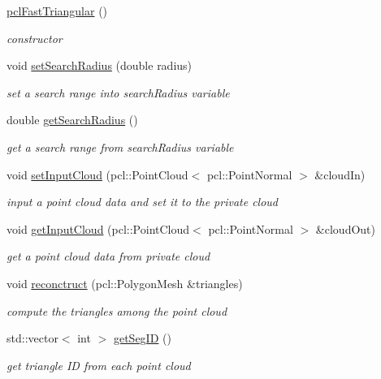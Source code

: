 \begin{DoxyCompactItemize}
\item 
\hyperlink{classpclFastTriangular_a0535f67efbb9378f65b59b1e864467ae}{pcl\+Fast\+Triangular} ()\hypertarget{classpclFastTriangular_a0535f67efbb9378f65b59b1e864467ae}{}\label{classpclFastTriangular_a0535f67efbb9378f65b59b1e864467ae}

\begin{DoxyCompactList}\small\item\em constructor \end{DoxyCompactList}\item 
void \hyperlink{classpclFastTriangular_a46541fbe8942a38c73f059a7bcaeda9c}{set\+Search\+Radius} (double radius)
\begin{DoxyCompactList}\small\item\em set a search range into search\+Radius variable \end{DoxyCompactList}\item 
double \hyperlink{classpclFastTriangular_a866f045ce0907e64c870790641b907a7}{get\+Search\+Radius} ()
\begin{DoxyCompactList}\small\item\em get a search range from search\+Radius variable \end{DoxyCompactList}\item 
void \hyperlink{classpclFastTriangular_acaa55d1c898ea7bf0967051561a6f9fb}{set\+Input\+Cloud} (pcl\+::\+Point\+Cloud$<$ pcl\+::\+Point\+Normal $>$ \&cloud\+In)
\begin{DoxyCompactList}\small\item\em input a point cloud data and set it to the private cloud \end{DoxyCompactList}\item 
void \hyperlink{classpclFastTriangular_ac065538d664120522a4887503011ba20}{get\+Input\+Cloud} (pcl\+::\+Point\+Cloud$<$ pcl\+::\+Point\+Normal $>$ \&cloud\+Out)
\begin{DoxyCompactList}\small\item\em get a point cloud data from private cloud \end{DoxyCompactList}\item 
void \hyperlink{classpclFastTriangular_a7739a064f2e156ce15860c2ca5396965}{reconctruct} (pcl\+::\+Polygon\+Mesh \&triangles)
\begin{DoxyCompactList}\small\item\em compute the triangles among the point cloud \end{DoxyCompactList}\item 
std\+::vector$<$ int $>$ \hyperlink{classpclFastTriangular_a951fc84428537bc92bcbef1d9e88f4a8}{get\+Seg\+ID} ()
\begin{DoxyCompactList}\small\item\em get triangle ID from each point cloud \end{DoxyCompactList}\end{DoxyCompactItemize}


